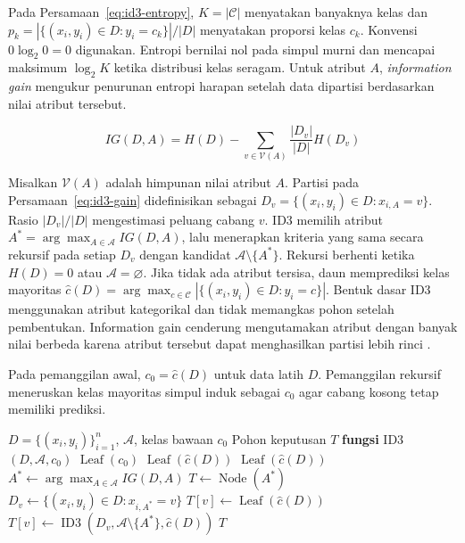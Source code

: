 Pada Persamaan~\ref{eq:id3-entropy}, $K=|\mathcal{C}|$ menyatakan banyaknya kelas dan $p_k=|\{(x_i,y_i)\in D:y_i=c_k\}|/|D|$ menyatakan proporsi kelas $c_k$. Konvensi $0\log_2 0=0$ digunakan. Entropi bernilai nol pada simpul murni dan mencapai maksimum $\log_2 K$ ketika distribusi kelas seragam. Untuk atribut $A$, \textit{information gain} mengukur penurunan entropi harapan setelah data dipartisi berdasarkan nilai atribut tersebut.

\begin{equation}
    IG(D,A)=H(D)-\sum_{v\in\mathcal{V}(A)}\frac{|D_v|}{|D|}H(D_v)
    \label{eq:id3-gain}
\end{equation}

Misalkan $\mathcal{V}(A)$ adalah himpunan nilai atribut $A$. Partisi pada Persamaan~\ref{eq:id3-gain} didefinisikan sebagai $D_v=\{(x_i,y_i)\in D:x_{i,A}=v\}$. Rasio $|D_v|/|D|$ mengestimasi peluang cabang $v$. ID3 memilih atribut $A^*=\arg\max_{A\in\mathcal{A}}IG(D,A)$, lalu menerapkan kriteria yang sama secara rekursif pada setiap $D_v$ dengan kandidat $\mathcal{A}\setminus\{A^*\}$. Rekursi berhenti ketika $H(D)=0$ atau $\mathcal{A}=\varnothing$. Jika tidak ada atribut tersisa, daun memprediksi kelas mayoritas $\hat{c}(D)=\arg\max_{c\in\mathcal{C}}|\{(x_i,y_i)\in D:y_i=c\}|$. Bentuk dasar ID3 menggunakan atribut kategorikal dan tidak memangkas pohon setelah pembentukan. Information gain cenderung mengutamakan atribut dengan banyak nilai berbeda karena atribut tersebut dapat menghasilkan partisi lebih rinci \cite{quinlan1986id3}.

Pada pemanggilan awal, $c_0=\hat{c}(D)$ untuk data latih $D$. Pemanggilan rekursif meneruskan kelas mayoritas simpul induk sebagai $c_0$ agar cabang kosong tetap memiliki prediksi.

\begin{algorithm}[H]
    \caption{Pembentukan pohon klasifikasi menggunakan ID3}
    \label{alg:id3}
    \begin{algorithmic}[1]
        \REQUIRE $D=\{(x_i,y_i)\}_{i=1}^{n}$, $\mathcal{A}$, kelas bawaan $c_0$
        \ENSURE Pohon keputusan $T$
        \STATE \textbf{fungsi} ID3$(D,\mathcal{A},c_0)$
        \RETURN $\operatorname{Leaf}(c_0)$
        \ENDIF
        \RETURN $\operatorname{Leaf}(\hat{c}(D))$
        \ENDIF
        \RETURN $\operatorname{Leaf}(\hat{c}(D))$
        \ENDIF
        \STATE $A^*\leftarrow\arg\max_{A\in\mathcal{A}}IG(D,A)$
        \STATE $T\leftarrow\operatorname{Node}(A^*)$
        \STATE $D_v\leftarrow\{(x_i,y_i)\in D:x_{i,A^*}=v\}$
        \STATE $T[v]\leftarrow\operatorname{Leaf}(\hat{c}(D))$
        \ELSE
        \STATE $T[v]\leftarrow\operatorname{ID3}(D_v,\mathcal{A}\setminus\{A^*\},\hat{c}(D))$
        \ENDIF
        \ENDFOR
        \RETURN $T$
    \end{algorithmic}
\end{algorithm}

